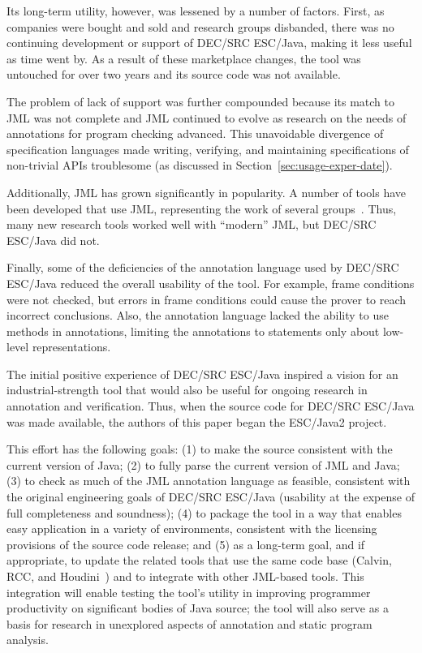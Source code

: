 \documentclass{sig-alternate}
\begin{document}
Its long-term utility, however, was lessened by a number of factors.
First, as companies were bought and sold and research groups
disbanded, there was no continuing development or support of DEC/SRC
ESC/Java, making it less useful as time went by.  As a result of these
marketplace changes, the tool was untouched for over two years and its
source code was not available.  

The problem of lack of support was further compounded because its
match to JML was not complete and JML continued to evolve as
research on the needs of annotations for program checking advanced.
This unavoidable divergence of specification languages made writing,
verifying, and maintaining specifications of non-trivial APIs
troublesome (as discussed in Section~\ref{sec:usage-exper-date}).

Additionally, JML has grown significantly in popularity.  A number of
tools have been developed that use JML, representing the work of several
groups~\cite{Burdy-etal03,jmlpapers,Bogor03,NimmerErnst01,Leavens-etal00}.
Thus, many new research tools worked well with ``modern'' JML, but
DEC/SRC ESC/Java did not.

Finally, some of the deficiencies of the annotation language used by
DEC/SRC ESC/Java reduced the overall usability of the tool.  For
example, frame conditions were not checked, but errors in frame
conditions could cause the prover to reach incorrect conclusions.
Also, the annotation language lacked the ability to use methods in
annotations, limiting the annotations to statements only about
low-level representations.

The initial positive experience of DEC/SRC ESC/Java inspired a vision
for an industrial-strength tool that would also be useful for ongoing
research in annotation and verification.  Thus, when the source code
for DEC/SRC ESC/Java was made available, the authors of this paper
began the ESC/Java2 project.  

This effort has the following goals:
(1) to make the source consistent with the current version of Java;
(2) to fully parse the current version of JML and Java;
(3) to check as much of the JML annotation language as feasible,
consistent with the original engineering goals of DEC/SRC ESC/Java
(usability at the expense of full completeness and soundness); 
(4) to package the tool in a way that enables easy application in a
variety of environments, consistent with the licensing provisions of
the source code release;
and
(5) as a long-term goal, and if appropriate, to update the related
tools that use the same code base (Calvin, RCC, and Houdini~\cite{flanagan01houdini}) and to
integrate with other JML-based tools.  This integration will
enable testing the tool's utility in improving programmer
productivity on significant bodies of Java source;
the tool will also serve as a basis for research in unexplored aspects of
annotation and static program analysis.
  
\end{document}

